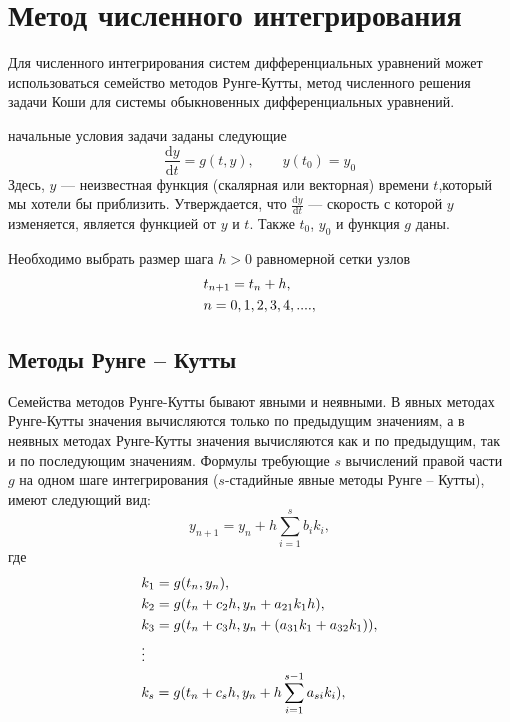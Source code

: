 \documentclass[a4paper,12pt]{article}
\newcommand{\dd}{\mathrm{d}}
\begin{document}
	\section{Метод численного интегрирования}
	Для численного интегрирования систем дифференциальных уравнений может использоваться семейство методов Рунге-Кутты, метод численного решения задачи Коши для системы обыкновенных дифференциальных уравнений. 
	
	начальные условия задачи заданы следующие
	\begin{equation}\label{eq:2} 
		\frac{\dd y}{\dd t}=g(t,y),\qquad y(t_0)=y_0
	\end{equation}
	Здесь, \(y\) — неизвестная функция (скалярная или векторная) времени \(t\),который мы хотели бы приблизить. Утверждается, что \(\frac{\dd y}{\dd t}\) — скорость с которой \(y\) изменяется, является функцией от \(y\) и \(t\). Также \(t_0\), \(y_0\) и функция \(g\) даны.
	
	Необходимо выбрать размер шага \(h>0\) равномерной сетки узлов
	\begin{equation}\label{eq:2} 
		\begin{lgathered}
			t_{n+1}=t_n+h,\\
			n=0, 1, 2, 3, 4, ....,\\
		\end{lgathered}
	\end{equation}
	\subsection{Методы Рунге – Кутты}
	Семейства методов Рунге-Кутты бывают явными и неявными. В явных методах Рунге-Кутты значения вычисляются только по предыдущим значениям, а в неявных методах Рунге-Кутты значения вычисляются как и по предыдущим, так и по последующим значениям. Формулы требующие \(s\) вычислений правой части \(g\) на одном шаге интегрирования  (\(s\)-стадийные явные методы Рунге – Кутты), имеют следующий вид:
	\begin{equation}\label{eq:2} 
		y_{n+1}=y_n+h\sum_{i=1}^{s}b_ik_i,
	\end{equation}
	где
	\begin{equation}\label{eq:2} 
		\begin{lgathered} 
			k_1=g(t_n, y_n),\\
			k_2=g(t_n+c_2h, y_n+a_{21}k_1h),\\
			k_3=g(t_n+c_3h, y_n+(a_{31}k_1+a_{32}k_1)),\\
			\vdots\\
			k_s=g(t_n+c_sh, y_n+h\sum_{i=1}^{s-1}a_{si}k_i),\\
		\end{lgathered}
	\end{equation}
\end{document}
